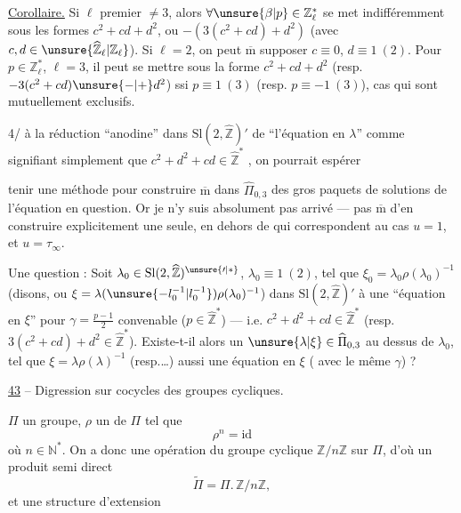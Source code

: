 \uline{Corollaire.}  Si $\ell$  premier $\ne3$, alors $\forall\unsure{\beta|p}\in\mathbb Z_\ell^{*}$ se met indifféremment sous les formes $c^2+cd+d^2$, ou $-(3(c^2+cd)+d^2)$ (avec $c,d\in\unsure{\widehat{\mathbb Z}_\ell|\mathbb Z_\ell}$). Si $\ell=2$, on peut $\overline{\mathrm m}$ supposer $c\equiv0$, $d\equiv1\ (2)$. Pour $p\in\mathbb Z_\ell^{*}$, $\ell=3$, il peut se mettre sous la forme $c^2+cd+d^2$ (resp. $-3(c^2+cd)\unsure{-|+}d^2$) ssi $p\equiv1\ (3)$ (resp. $p\equiv-1\ (3)$), cas qui sont mutuellement exclusifs.

4/  à la réduction ``anodine'' dans $\mathrm{Sl}(2,\widehat{\mathbb Z})'$ de ``l'équation en $\lambda$'' comme signifiant simplement que $c^2+d^2+cd\in\widehat{\mathbb Z}^{*}$ , on pourrait espérer


tenir une méthode pour construire $\overline{\mathrm m}$ dans $\widehat{\Pi}_{0,3}$ des gros paquets de solutions de l'équation en question. Or je n'y suis absolument pas arrivé --- pas $\overline{\mathrm m}$ d'en construire explicitement une seule, en dehors de  qui correspondent au cas $u=1$, et $u=\tau_\infty$.

Une question : Soit $\lambda_0\in\mathrm{Sl}(2,\widehat{\mathbb Z})^{\unsure{\prime|*}}$, $\lambda_0\equiv1\ (2)$, tel que $\xi_0=\lambda_0\rho(\lambda_0)^{-1}$ (disons, ou $\xi=\lambda(\unsure{-l_0^{-1}|l_0^{-1}})\rho(\lambda_0)^{-1}$)   dans $\mathrm{Sl}(2,\widehat{\mathbb Z})'$ à une ``équation en $\xi$'' pour $\gamma=\frac{p-1}{2}$ convenable ($p\in\widehat{\mathbb Z}^{*}$) --- i.e. $c^2+d^2+cd\in\widehat{\mathbb Z}^{*}$ (resp. $3(c^2+cd)+d^2\in\widehat{\mathbb Z}^{*}$). Existe-t-il alors un $\unsure{\lambda|\xi}\in\widehat{\Pi}_{0,3}$ au dessus de $\lambda_0$, tel que $\xi=\lambda\rho(\lambda)^{-1}$ (resp.\ldots)  aussi une équation en $\xi$ ( avec le même $\gamma$) ?


\uline{43}  -- Digression sur cocycles des groupes cycliques.

 $\Pi$ un groupe, $\rho$ un  de $\Pi$ tel que
\[
\rho^n=\mathrm{id} \tag{1}
\]
où $n\in\mathbb N^*$. On a donc une opération du groupe cyclique $\mathbb Z/n\mathbb Z$ sur $\Pi$, d'où un produit semi direct
\[
\widetilde\Pi=\Pi.\,\mathbb Z/n\mathbb Z, \tag{2}
\]
et une structure d'extension

